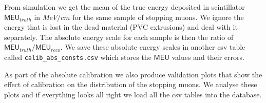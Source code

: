 \documentclass[12pt,a4paper]{article}
\begin{document}
From simulation we get the mean of the true energy deposited in scintillator $\textsf{MEU}_{truth}$ in $\unit{MeV/cm}$ for the same sample of stopping muons. We ignore the energy that is lost in the dead material (PVC extrusions) and deal with it separately. The absolute energy scale for each sample is then the ratio of $\textsf{MEU}_{truth}/\textsf{MEU}_{reco}$. We save these absolute energy scales in another csv table called \texttt{calib\_abs\_consts.csv} which stores the $\textsf{MEU}$ values and their errors.

As part of the absolute calibration we also produce validation plots that show the effect of calibration on the distribution of the stopping muons. We analyse these plots and if everything looks all right we load all the csv tables into the database.

\end{document}
